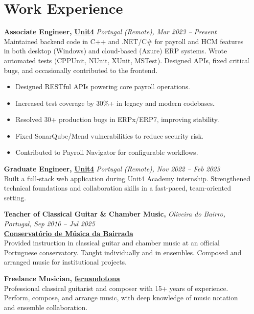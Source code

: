 \documentclass[a4paper,10pt]{article}
\begin{document}
\section{Work Experience}
\begin{tcolorbox}
\textbf{Associate Engineer, \href{https://www.unit4.com/}{Unit4}} \hfill \textit{Portugal (Remote), Mar 2023 -- Present}\\
Maintained backend code in C++ and .NET/C\# for payroll and HCM features in both desktop (Windows) and cloud-based (Azure) ERP systems. Wrote automated tests (CPPUnit, NUnit, XUnit, MSTest). Designed APIs, fixed critical bugs, and occasionally contributed to the frontend.

\begin{itemize}[leftmargin=*, itemsep=1.5pt]
  \item Designed RESTful APIs powering core payroll operations.
  \item Increased test coverage by 30\%+ in legacy and modern codebases.
  \item Resolved 30+ production bugs in ERPx/ERP7, improving stability.
  \item Fixed SonarQube/Mend vulnerabilities to reduce security risk.
  \item Contributed to Payroll Navigator for configurable workflows.
\end{itemize}
\vspace{3pt}

\textbf{Graduate Engineer, \href{https://www.unit4.com/}{Unit4}} \hfill \textit{Portugal (Remote), Nov 2022 -- Feb 2023}\\
Built a full-stack web application during Unit4 Academy internship. Strengthened technical foundations and collaboration skills in a fast-paced, team-oriented setting.\end{tcolorbox}

\textbf{Teacher of Classical Guitar \& Chamber Music,} \hfill \textit{Oliveira do Bairro, Portugal, Sep 2010 -- Jul 2025}\\
\textbf{\href{https://escolartes.com}{Conservatório de Música da Bairrada}}\\
Provided instruction in classical guitar and chamber music at an official Portuguese conservatory. Taught individually and in ensembles. Composed and arranged music for institutional projects.

\textbf{Freelance Musician, \href{https://linktr.ee/fernandotona}{fernandotona}}\\
Professional classical guitarist and composer with 15+ years of experience. Perform, compose, and arrange music, with deep knowledge of music notation and ensemble collaboration.
\end{document}
